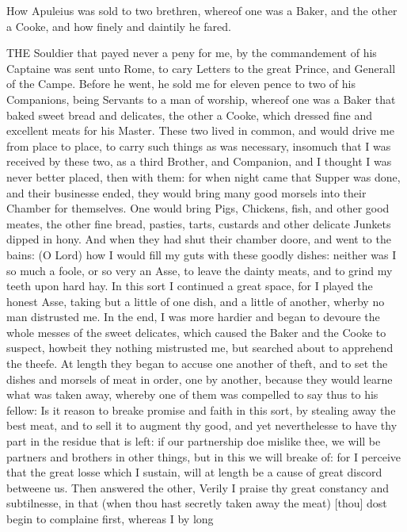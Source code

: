 
How Apuleius was sold to two brethren, whereof one was a Baker, and the other a
Cooke, and how finely and daintily he fared.

THE Souldier that payed never a peny for me, by the commandement of his
Captaine was sent unto Rome, to cary Letters to the great Prince, and Generall
of the Campe. Before he went, he sold me for eleven pence to two of his
Companions, being Servants to a man of worship, whereof one was a Baker that
baked sweet bread and delicates, the other a Cooke, which dressed fine and
excellent meats for his Master. These two lived in common, and would drive me
from place to place, to carry such things as was necessary, insomuch that I was
received by these two, as a third Brother, and Companion, and I thought I was
never better placed, then with them: for when night came that Supper was done,
and their businesse ended, they would bring many good morsels into their
Chamber for themselves. One would bring Pigs, Chickens, fish, and other good
meates, the other fine bread, pasties, tarts, custards and other delicate
Junkets dipped in hony. And when they had shut their chamber doore, and went to
the bains: (O Lord) how I would fill my guts with these goodly dishes: neither
was I so much a foole, or so very an Asse, to leave the dainty meats, and to
grind my teeth upon hard hay. In this sort I continued a great space, for I
played the honest Asse, taking but a little of one dish, and a little of
another, wherby no man distrusted me. In the end, I was more hardier and began
to devoure the whole messes of the sweet delicates, which caused the Baker and
the Cooke to suspect, howbeit they nothing mistrusted me, but searched about to
apprehend the theefe. At length they began to accuse one another of theft, and
to set the dishes and morsels of meat in order, one by another, because they
would learne what was taken away, whereby one of them was compelled to say thus
to his fellow: Is it reason to breake promise and faith in this sort, by
stealing away the best meat, and to sell it to augment thy good, and yet
neverthelesse to have thy part in the residue that is left: if our partnership
doe mislike thee, we will be partners and brothers in other things, but in this
we will breake of: for I perceive that the great losse which I sustain, will at
length be a cause of great discord betweene us. Then answered the other, Verily
I praise thy great constancy and subtilnesse, in that (when thou hast secretly
taken away the meat) [thou] dost begin to complaine first, whereas I by long
